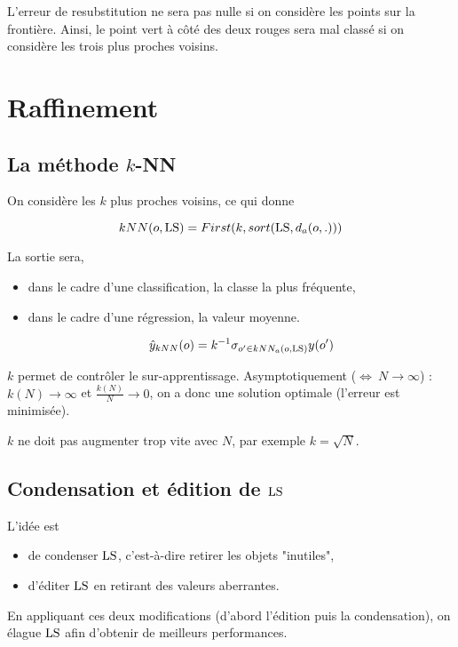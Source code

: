 	L'erreur de resubstitution ne sera pas nulle si on considère les points sur la frontière. Ainsi, le point vert à côté des deux rouges sera mal classé si on considère les trois plus proches voisins.
	
	\section{Raffinement}
	
		\subsection{La méthode $k$-NN}
		
		On considère les $k$ plus proches voisins, ce qui donne
		
		$$kNN(o, \text{LS}) = First(k, sort(\text{LS}, d_a(o, .)))$$
		
		La sortie sera,
		
		\begin{itemize}
			\item dans le cadre d'une classification, la classe la plus fréquente,
			\item dans le cadre d'une régression, la valeur moyenne.
			
			$$\hat{y}_{kNN}(o) = k^{-1} \sigma_{o' \in kNN_a(o, \text{LS})} y(o')$$
		\end{itemize}
		
		$k$ permet de contrôler le sur-apprentissage. Asymptotiquement ($\Leftrightarrow \: N \rightarrow \infty$) : $k(N) \rightarrow \infty$ et $\frac{k(N)}{N} \rightarrow 0$, on a donc une solution optimale (l'erreur est minimisée).
		
		
		$k$ ne doit pas augmenter trop vite avec $N$, par exemple $k = \sqrt{N}$.
		
		\subsection{Condensation et édition de $\text{LS}$}
		
		L'idée est
		
		\begin{itemize}
			\item de condenser $\text{LS}$, c'est-à-dire retirer les objets "inutiles",
			\item d'éditer $\text{LS}$ en retirant des valeurs aberrantes.
		\end{itemize}
		
		En appliquant ces deux modifications (d'abord l'édition puis la condensation), on élague $\text{LS}$ afin d'obtenir de meilleurs performances.
		
